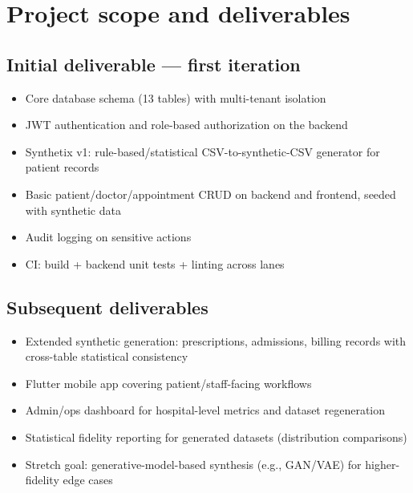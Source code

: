 \documentclass[11pt]{article}
\begin{document}
\section{Project scope and deliverables}

\subsection{Initial deliverable --- first iteration}
\begin{itemize}
    \item Core database schema (13 tables) with multi-tenant isolation
    \item JWT authentication and role-based authorization on the backend
    \item Synthetix v1: rule-based/statistical CSV-to-synthetic-CSV generator for patient records
    \item Basic patient/doctor/appointment CRUD on backend and frontend, seeded with synthetic data
    \item Audit logging on sensitive actions
    \item CI: build + backend unit tests + linting across lanes
\end{itemize}

\subsection{Subsequent deliverables}
\begin{itemize}
    \item Extended synthetic generation: prescriptions, admissions, billing records with cross-table statistical consistency
    \item Flutter mobile app covering patient/staff-facing workflows
    \item Admin/ops dashboard for hospital-level metrics and dataset regeneration
    \item Statistical fidelity reporting for generated datasets (distribution comparisons)
    \item Stretch goal: generative-model-based synthesis (e.g., GAN/VAE) for higher-fidelity edge cases
\end{itemize}
\end{document}
